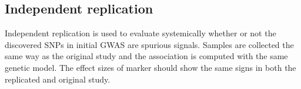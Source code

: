	\subsection{Independent replication}
	Independent replication is used to evaluate systemically whether or not the discovered SNPs in initial GWAS are spurious signals.
	Samples are collected the same way as the original study and the association is computed with the same genetic model.
	The effect sizes of marker should show the same signs in both the replicated and original study.
